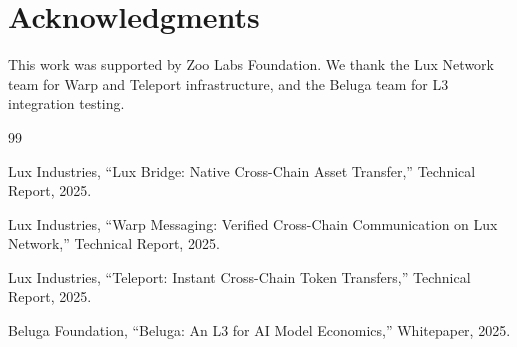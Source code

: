 \section*{Acknowledgments}


This work was supported by Zoo Labs Foundation. We thank the Lux Network team for Warp and Teleport infrastructure, and the Beluga team for L3 integration testing.


\begin{thebibliography}{99}

Lux Industries, ``Lux Bridge: Native Cross-Chain Asset Transfer,'' Technical Report, 2025.

Lux Industries, ``Warp Messaging: Verified Cross-Chain Communication on Lux Network,'' Technical Report, 2025.

Lux Industries, ``Teleport: Instant Cross-Chain Token Transfers,'' Technical Report, 2025.

Beluga Foundation, ``Beluga: An L3 for AI Model Economics,'' Whitepaper, 2025.

\end{thebibliography}

